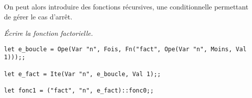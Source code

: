 On peut alors introduire des fonctions récursives, une conditionnelle permettant de gérer le cas d'arrêt.
\begin{Exercise}\it
Écrire la fonction factorielle.
\end{Exercise}
\begin{Answer}
\begin{lstlisting}
let e_boucle = Ope(Var "n", Fois, Fn("fact", Ope(Var "n", Moins, Val 1)));;
                  
let e_fact = Ite(Var "n", e_boucle, Val 1);;

let fonc1 = ("fact", "n", e_fact)::fonc0;;
\end{lstlisting} 
\end{Answer}


